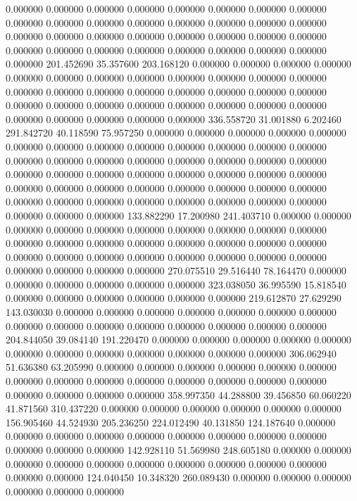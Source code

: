 0.000000 0.000000 0.000000
0.000000 0.000000 0.000000
0.000000 0.000000 0.000000
0.000000 0.000000 0.000000
0.000000 0.000000 0.000000
0.000000 0.000000 0.000000
0.000000 0.000000 0.000000
0.000000 0.000000 0.000000
0.000000 0.000000 0.000000
0.000000 0.000000 0.000000
0.000000 0.000000 0.000000
201.452690 35.357600 203.168120
0.000000 0.000000 0.000000
0.000000 0.000000 0.000000
0.000000 0.000000 0.000000
0.000000 0.000000 0.000000
0.000000 0.000000 0.000000
0.000000 0.000000 0.000000
0.000000 0.000000 0.000000
0.000000 0.000000 0.000000
0.000000 0.000000 0.000000
0.000000 0.000000 0.000000
0.000000 0.000000 0.000000
336.558720 31.001880 6.202460
291.842720 40.118590 75.957250
0.000000 0.000000 0.000000
0.000000 0.000000 0.000000
0.000000 0.000000 0.000000
0.000000 0.000000 0.000000
0.000000 0.000000 0.000000
0.000000 0.000000 0.000000
0.000000 0.000000 0.000000
0.000000 0.000000 0.000000
0.000000 0.000000 0.000000
0.000000 0.000000 0.000000
0.000000 0.000000 0.000000
0.000000 0.000000 0.000000
0.000000 0.000000 0.000000
0.000000 0.000000 0.000000
0.000000 0.000000 0.000000
0.000000 0.000000 0.000000
133.882290 17.200980 241.403710
0.000000 0.000000 0.000000
0.000000 0.000000 0.000000
0.000000 0.000000 0.000000
0.000000 0.000000 0.000000
0.000000 0.000000 0.000000
0.000000 0.000000 0.000000
0.000000 0.000000 0.000000
0.000000 0.000000 0.000000
0.000000 0.000000 0.000000
0.000000 0.000000 0.000000
270.075510 29.516440 78.164470
0.000000 0.000000 0.000000
0.000000 0.000000 0.000000
323.038050 36.995590 15.818540
0.000000 0.000000 0.000000
0.000000 0.000000 0.000000
219.612870 27.629290 143.030030
0.000000 0.000000 0.000000
0.000000 0.000000 0.000000
0.000000 0.000000 0.000000
0.000000 0.000000 0.000000
0.000000 0.000000 0.000000
204.844050 39.084140 191.220470
0.000000 0.000000 0.000000
0.000000 0.000000 0.000000
0.000000 0.000000 0.000000
0.000000 0.000000 0.000000
306.062940 51.636380 63.205990
0.000000 0.000000 0.000000
0.000000 0.000000 0.000000
0.000000 0.000000 0.000000
0.000000 0.000000 0.000000
0.000000 0.000000 0.000000
0.000000 0.000000 0.000000
358.997350 44.288800 39.456850
60.060220 41.871560 310.437220
0.000000 0.000000 0.000000
0.000000 0.000000 0.000000
156.905460 44.524930 205.236250
224.012490 40.131850 124.187640
0.000000 0.000000 0.000000
0.000000 0.000000 0.000000
0.000000 0.000000 0.000000
0.000000 0.000000 0.000000
142.928110 51.569980 248.605180
0.000000 0.000000 0.000000
0.000000 0.000000 0.000000
0.000000 0.000000 0.000000
0.000000 0.000000 0.000000
124.040450 10.348320 260.089430
0.000000 0.000000 0.000000
0.000000 0.000000 0.000000
